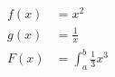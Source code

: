 \documentclass{article}
\begin{document}
	\begin{align*}
		f(x) &= x^2\\
		g(x) &= \frac{1}{x}\\
		F(x) &= \int_{a}^{b}
		\frac{1}{3}x^3
	\end{align*}
\end{document}
